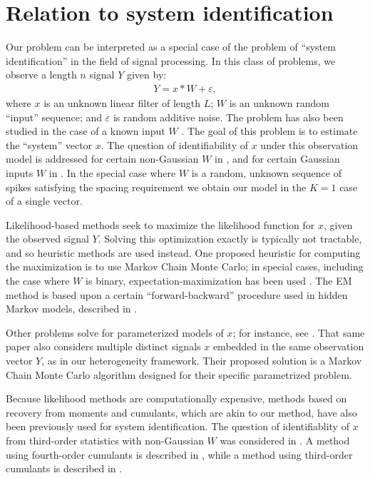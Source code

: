 \documentclass{article}
\theoremstyle{thm}
\theoremstyle{definition}
\newcommand{\ep}{\varepsilon}
\newcommand{\1}{\mathbf{1}}
\begin{document}
%
%
%
%

\section{Relation to system identification}

Our problem can be interpreted as a special case of the problem of ``system identification'' in the field of signal processing. In this class of problems, we observe a length $n$ signal $Y$ given by:
%
\begin{align}
%
    Y = x \ast W + \ep,
%
\end{align}
%
where $x$ is an unknown linear filter of length $L$; $W$ is an unknown random ``input'' sequence; and $\ep$ is random additive noise. The problem has also been studied in the case of a known input $W$ \cite{pillonetto2010new,dinuzzo2015kernels,bottegal2016robust}.  The goal of this problem is to estimate the ``system'' vector $x$. The question of identifiability of $x$ under this observation model is addressed for certain non-Gaussian $W$ in \cite{benveniste1980}, and for certain Gaussian inputs $W$ in \cite{kormylo1983id}. In the special case where $W$ is a random, unknown sequence of spikes satisfying the spacing requirement we obtain our model in the $K=1$ case of a single vector. 

Likelihood-based methods seek to maximize the likelihood function for $x$, given the observed signal $Y$. Solving this optimization exactly is typically not tractable, and so heuristic methods are used instead. One proposed heuristic for computing the maximization is to use Markov Chain Monte Carlo; in special cases, including the case where $W$ is binary, expectation-maximization has been used \cite{cappe1999simulation}. The EM method is based upon a certain ``forward-backward'' procedure used in hidden Markov models, described in \cite{rabiner1989tutorial}.

Other problems solve for parameterized models of $x$; for instance, see \cite{andrieu2001bayesian}. That same paper also considers multiple distinct signals $x$ embedded in the same observation vector $Y$, as in our heterogeneity framework. Their proposed solution is a Markov Chain Monte Carlo algorithm designed for their specific parametrized problem.

Because likelihood methods are computationally expensive, methods based on recovery from moments and cumulants, which are akin to our method, have also been previously used for system identification. The question of identifiablity of $x$ from third-order statistics with non-Gaussian $W$ was considered in \cite{lii1982deconvolution}. A method using fourth-order cumulants is described in \cite{tugnait1984id}, while a method using third-order cumulants is described in \cite{giannakis1989id}.
\end{document}
